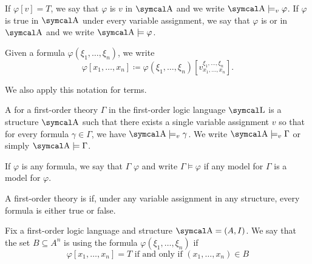 \begin{definition}
  If \( \varphi[v] = T \), we say that \( \varphi \) is  \( v \) in \( \CA \) and we write \( \CA \models_v \varphi \). If \( \varphi \) is true in \( \CA \) under every variable assignment, we say that \( \varphi \) is  or  in \( \CA \) and we write \( \CA \models \varphi \).

  Given a formula \( \varphi(\xi_1, \ldots, \xi_n) \), we write
  \begin{equation*}
    \varphi[x_1, \ldots, x_n] \coloneqq \varphi(\xi_1, \ldots, \xi_n)[v_{x_1, \ldots, x_n}^{\xi_1, \ldots, \xi_n}].
  \end{equation*}

  We also apply this notation for terms.
\end{definition}

\begin{definition}\label{def:first_order_model}\cite[14.35]{OpenLogic20201202}
  A  for a first-order theory \( \Gamma \) in the first-order logic language \( \CL \) is a structure \( \CA \) such that there exists a single variable assignment \( v \) so that for every formula \( \gamma \in \Gamma \), we have \( \CA \models_v \gamma \). We write \( \CA \models_v \Gamma \) or simply \( \CA \models \Gamma \).

  If \( \varphi \) is any formula, we say that \( \Gamma \)  \( \varphi \) and write \( \Gamma \models \varphi \) if any model for \( \Gamma \) is a model for \( \varphi \).
\end{definition}

\begin{definition}\label{def:first_order_consistency}
  A first-order theory is  if, under any variable assignment in any structure, every formula is either true or false.
\end{definition}

\begin{definition}\label{def:first_order_definability}
  Fix a first-order logic language and structure \( \CA = (A, I) \). We say that the set \( B \subseteq A^n \) is  using the formula \( \varphi(\xi_1, \ldots, \xi_n) \) if
  \begin{equation*}
    \varphi[x_1, \ldots, x_n] = T \text{ if and only if } (x_1, \ldots, x_n) \in B
  \end{equation*}
\end{definition}


